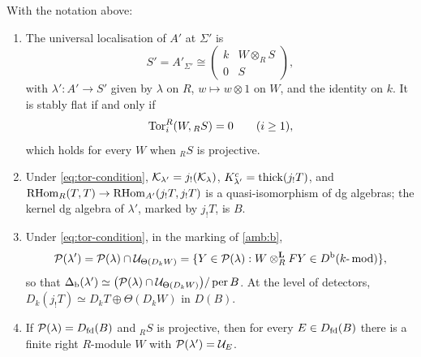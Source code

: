 \begin{theorem}\label{thm:ambient}
With the notation above:
\begin{enumerate}[label=\textup{(\alph*)}]
\item\label{amb:a} The universal localisation of \(A'\) at \(\Sigma'\) is
\begin{equation}\label{eq:ambient-target}
 S'=A'_{\Sigma'}\cong\begin{pmatrix}k&W\otimes_RS\\0&S\end{pmatrix},
\end{equation}
with \(\lambda':A'\to S'\) given by \(\lambda\) on \(R\), \(w\mapsto w\otimes1\) on \(W\), and the identity on \(k\).  It is stably flat if and only if
\begin{equation}\label{eq:tor-condition}
 \operatorname{Tor}_i^R(W,{}_RS)=0\qquad(i\ge1),
\end{equation}
which holds for every \(W\) when \({}_RS\) is projective.
\item\label{amb:b} Under \eqref{eq:tor-condition}, \(\mathcal K_{\lambda'}=j_!(\mathcal K_\lambda)\), \(K^c_{\lambda'}=\operatorname{thick}(j_!T)\), and \(\operatorname{RHom}_R(T,T)\to\operatorname{RHom}_{A'}(j_!T,j_!T)\) is a quasi-isomorphism of dg algebras; the kernel dg algebra of \(\lambda'\), marked by \(j_!T\), is \(B\).
\item\label{amb:c} Under \eqref{eq:tor-condition}, in the marking of \ref{amb:b},
\begin{equation}\label{eq:profile-intersection}
 \mathcal P(\lambda')=\mathcal P(\lambda)\cap\mathcal U_{\Theta(D_kW)}=\{Y\in\mathcal P(\lambda):W\otimes^{\mathbf L}_RFY\in D^{\mathrm b}(k\text{-}\operatorname{mod})\},
\end{equation}
so that \(\Delta_{\mathrm b}(\lambda')\simeq\bigl(\mathcal P(\lambda)\cap\mathcal U_{\Theta(D_kW)}\bigr)/\operatorname{per} B\).  At the level of detectors, \(D_k(j_!T)\simeq D_kT\oplus\Theta(D_kW)\) in \(D(B)\).
\item\label{amb:d} If \(\mathcal P(\lambda)=D_{\mathrm{fd}}(B)\) and \({}_RS\) is projective, then for every \(E\in D_{\mathrm{fd}}(B)\) there is a finite right \(R\)-module \(W\) with \(\mathcal P(\lambda')=\mathcal U_E\).
\end{enumerate}
\end{theorem}

